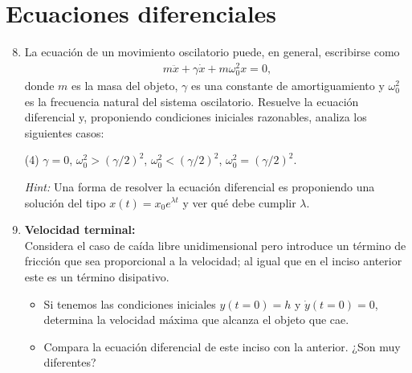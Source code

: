 \documentclass[12pt]{article}
\theoremstyle{problem}
\begin{document}
\section*{Ecuaciones diferenciales}
\begin{enumerate}[label={\textbf{3.\arabic*)}}]
    \setcounter{enumi}{7}
    \item La ecuación de un movimiento oscilatorio puede, en general, escribirse como
    \begin{align*}
       m \ddot{x} + \gamma \dot{x} + m\omega_{0}^{2}x = 0,
    \end{align*}
    donde \(m\) es la masa del objeto, \(\gamma\) es una constante de amortiguamiento y \(\omega_{0}^{2}\) es la frecuencia natural del sistema oscilatorio. Resuelve la ecuación diferencial y, proponiendo condiciones iniciales razonables, analiza los siguientes casos:
    \begin{tasks}(4)
        \task \(\gamma = 0\),
        \task \(\omega_{0}^{2}>(\gamma/2)^{2}\),
        \task \(\omega_{0}^{2}<(\gamma/2)^{2}\),
        \task \(\omega_{0}^{2}=(\gamma/2)^{2}\).
    \end{tasks}
    \textit{Hint:} Una forma de resolver la ecuación diferencial es proponiendo una solución del tipo \(x(t)= x_{0}e^{\lambda t}\) y ver qué debe cumplir \(\lambda\).
    \item \textbf{Velocidad terminal:}\\
    Considera el caso de caída libre unidimensional pero introduce un término de fricción que sea proporcional a la velocidad; al igual que en el inciso anterior este es un término disipativo.
    \begin{itemize}[label = \textbullet]
    \item  Si tenemos las condiciones iniciales \(y(t=0) = h\) y \(\dot{y}(t=0) = 0\), determina la velocidad máxima que alcanza el objeto que cae.
    \item Compara la ecuación diferencial de este inciso con la anterior. ¿Son muy diferentes?
    \end{itemize}
\end{enumerate}
\end{document}
